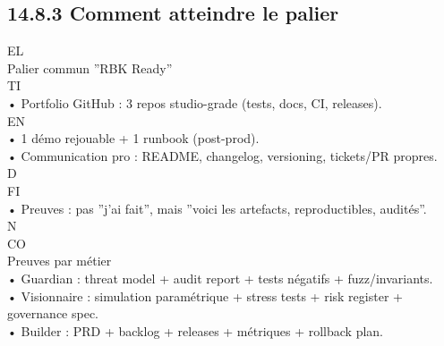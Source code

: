 \documentclass[12pt,landscape,a4paper]{article}
\begin{document}
\subsection{14.8.3 Comment atteindre le palier}
\vspace{0.5em}
\vspace{0.5em}
\vspace{0.5em}
\vspace{0.5em}
EL\\
Palier commun ”RBK Ready”\\
\vspace{0.5em}
\vspace{0.5em}
\vspace{0.5em}
\vspace{0.5em}
TI\\
• Portfolio GitHub : 3 repos studio-grade (tests, docs, CI, releases).\\
\vspace{0.5em}
\vspace{0.5em}
\vspace{0.5em}
\vspace{0.5em}
EN\\
• 1 démo rejouable + 1 runbook (post-prod).\\
\vspace{0.5em}
• Communication pro : README, changelog, versioning, tickets/PR propres.\\
\vspace{0.5em}
\vspace{0.5em}
\vspace{0.5em}
\vspace{0.5em}
D\\
FI\\
• Preuves : pas ”j’ai fait”, mais ”voici les artefacts, reproductibles, audités”.\\
\vspace{0.5em}
N\\
CO\\
Preuves par métier\\
\vspace{0.5em}
• Guardian : threat model + audit report + tests négatifs + fuzz/invariants.\\
\vspace{0.5em}
• Visionnaire : simulation paramétrique + stress tests + risk register + governance spec.\\
\vspace{0.5em}
• Builder : PRD + backlog + releases + métriques + rollback plan.\\
\end{document}

